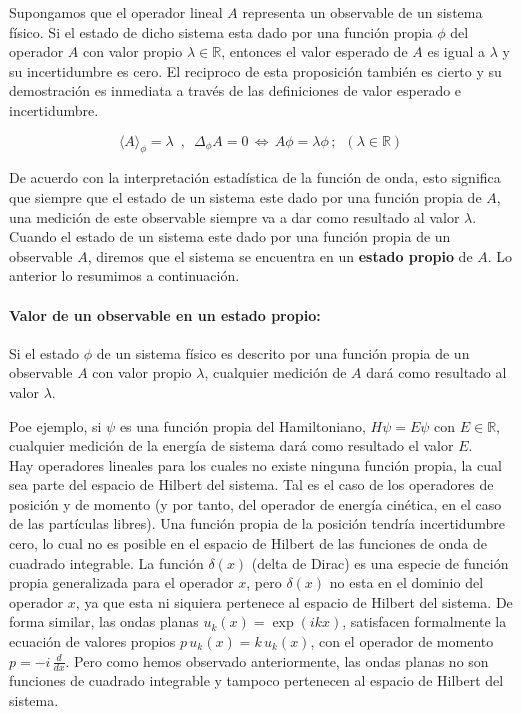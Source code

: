 \documentclass[12pt]{book}
\numberwithin{equation}{chapter}
\def\R{\mathbb{R}}
\def\la{\langle}
\def\ra{\rangle}
\def\sss{\Leftrightarrow}
\begin{document}
Supongamos que el operador lineal $A$ representa un observable de un sistema f\'isico. Si el estado de dicho sistema esta dado por una funci\'on propia $\phi$ del operador $A$ con valor propio $\lambda \in \R$, entonces el valor esperado de $A$ es igual a $\lambda$ y su incertidumbre es cero. El reciproco de esta proposici\'on tambi\'en es cierto y su demostraci\'on es inmediata a trav\'es de las definiciones de valor esperado e incertidumbre.

$$ \la A \ra_{\phi} = \lambda \,\,\,,\,\,\, \Delta_{\phi} A =0 \, \sss \, A\phi = \lambda \phi \,;\,\,\, (\lambda \in \R)  $$

De acuerdo con la interpretaci\'on estad\'istica de la funci\'on de onda, esto significa que siempre que el estado de un sistema este dado por una funci\'on propia de $A$, una medici\'on de este observable siempre va a dar como resultado al valor $\lambda$.\\
Cuando el estado de un sistema este dado por una funci\'on propia de un observable $A$, diremos que el sistema se encuentra en un {\bf estado propio} de $A$. Lo anterior lo resumimos a continuaci\'on.

\paragraph{Valor de un observable en un estado propio:} Si el estado $\phi$ de un sistema f\'isico es descrito por una funci\'on propia de un observable $A$ con valor propio $\lambda$, cualquier medici\'on de $A$ dar\'a como resultado al valor $\lambda$.

\rightline{$\dag$}
\vspace{3 mm}

Poe ejemplo, si $\psi$ es una funci\'on propia del Hamiltoniano, $H \psi= E \psi$ con $E \in \R$, cualquier medici\'on de la energ\'ia de sistema dar\'a como resultado el valor $E$.\\

Hay operadores lineales para los cuales no existe ninguna funci\'on propia, la cual sea parte del espacio de Hilbert del sistema. Tal es el caso de los operadores de posici\'on y de momento (y por tanto, del operador de energ\'ia cin\'etica, en el caso de las part\'iculas libres). Una funci\'on propia de la posici\'on tendr\'ia incertidumbre cero, lo cual no es posible en el espacio de Hilbert de las funciones de onda de cuadrado integrable. La funci\'on $\delta(x)$ (delta de Dirac) es una especie de funci\'on propia generalizada para el operador $x$, pero $\delta(x)$ no esta en el dominio del operador $x$, ya que esta ni siquiera pertenece al espacio de Hilbert del sistema. De forma similar, las ondas planas $u_{k}(x)=\exp ( ikx )$, satisfacen formalmente la ecuaci\'on de valores propios $ p\, u_{k}(x)= k \, u_{k}(x) $, con el operador de momento $p= -i \, \frac{d}{dx} $. Pero como hemos observado anteriormente, las ondas planas no son funciones de cuadrado integrable y tampoco pertenecen al espacio de Hilbert del sistema. \\
\end{document}
